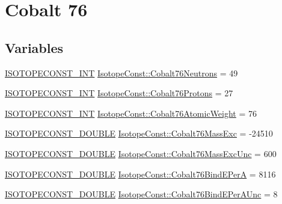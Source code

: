 \hypertarget{group___isotope_const-_cobalt-_co76}{}\section{Cobalt 76}
\label{group___isotope_const-_cobalt-_co76}
\subsection*{Variables}
\begin{DoxyCompactItemize}
\item 
\mbox{\hyperlink{group___isotope_const-_macros_ga5f18360b3e99483a35c32d789e62621c}{I\+S\+O\+T\+O\+P\+E\+C\+O\+N\+S\+T\+\_\+\+I\+NT}} \mbox{\hyperlink{group___isotope_const-_cobalt-_co76_ga6763d307b8de0126b57b1d736e6b5723}{Isotope\+Const\+::\+Cobalt76\+Neutrons}} = 49
\item 
\mbox{\hyperlink{group___isotope_const-_macros_ga5f18360b3e99483a35c32d789e62621c}{I\+S\+O\+T\+O\+P\+E\+C\+O\+N\+S\+T\+\_\+\+I\+NT}} \mbox{\hyperlink{group___isotope_const-_cobalt-_co76_ga0b932cb2388c97d09d9a47f04c145f3a}{Isotope\+Const\+::\+Cobalt76\+Protons}} = 27
\item 
\mbox{\hyperlink{group___isotope_const-_macros_ga5f18360b3e99483a35c32d789e62621c}{I\+S\+O\+T\+O\+P\+E\+C\+O\+N\+S\+T\+\_\+\+I\+NT}} \mbox{\hyperlink{group___isotope_const-_cobalt-_co76_ga3b84d4e58deda2edde7949865ed9b780}{Isotope\+Const\+::\+Cobalt76\+Atomic\+Weight}} = 76
\item 
\mbox{\hyperlink{group___isotope_const-_macros_ga8f45a7272ce02c0b4c65c44636ed719a}{I\+S\+O\+T\+O\+P\+E\+C\+O\+N\+S\+T\+\_\+\+D\+O\+U\+B\+LE}} \mbox{\hyperlink{group___isotope_const-_cobalt-_co76_ga64e10c16cad236af1bd5ac7d6ac134e3}{Isotope\+Const\+::\+Cobalt76\+Mass\+Exc}} = -\/24510
\item 
\mbox{\hyperlink{group___isotope_const-_macros_ga8f45a7272ce02c0b4c65c44636ed719a}{I\+S\+O\+T\+O\+P\+E\+C\+O\+N\+S\+T\+\_\+\+D\+O\+U\+B\+LE}} \mbox{\hyperlink{group___isotope_const-_cobalt-_co76_ga3130ff61089f64f1c384b0f120d348ad}{Isotope\+Const\+::\+Cobalt76\+Mass\+Exc\+Unc}} = 600
\item 
\mbox{\hyperlink{group___isotope_const-_macros_ga8f45a7272ce02c0b4c65c44636ed719a}{I\+S\+O\+T\+O\+P\+E\+C\+O\+N\+S\+T\+\_\+\+D\+O\+U\+B\+LE}} \mbox{\hyperlink{group___isotope_const-_cobalt-_co76_ga79866906c0809965f6919296cdbbd869}{Isotope\+Const\+::\+Cobalt76\+Bind\+E\+PerA}} = 8116
\item 
\mbox{\hyperlink{group___isotope_const-_macros_ga8f45a7272ce02c0b4c65c44636ed719a}{I\+S\+O\+T\+O\+P\+E\+C\+O\+N\+S\+T\+\_\+\+D\+O\+U\+B\+LE}} \mbox{\hyperlink{group___isotope_const-_cobalt-_co76_gabd4105220171b15ad9a85f52dc77d8b4}{Isotope\+Const\+::\+Cobalt76\+Bind\+E\+Per\+A\+Unc}} = 8

\end{DoxyCompactItemize}
